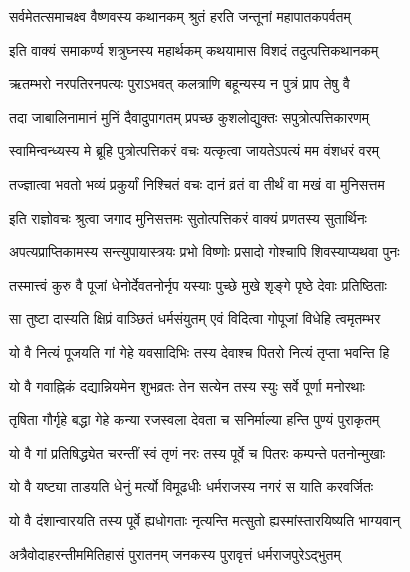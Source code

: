 \twolineshloka
{सर्वमेतत्समाचक्ष्व वैष्णवस्य कथानकम्}
{श्रुतं हरति जन्तूनां महापातकपर्वतम्}%


\twolineshloka
{इति वाक्यं समाकर्ण्य शत्रुघ्नस्य महार्थकम्}
{कथयामास विशदं तदुत्पत्तिकथानकम्}%

\twolineshloka
{ऋतम्भरो नरपतिरनपत्यः पुराऽभवत्}
{कलत्राणि बहून्यस्य न पुत्रं प्राप तेषु वै}%

\twolineshloka
{तदा जाबालिनामानं मुनिं दैवादुपागतम्}
{प्रपच्छ कुशलोद्युक्तः सपुत्रोत्पत्तिकारणम्}%


\twolineshloka
{स्वामिन्वन्ध्यस्य मे ब्रूहि पुत्रोत्पत्तिकरं वचः}
{यत्कृत्वा जायतेऽपत्यं मम वंशधरं वरम्}%

\twolineshloka
{तज्ज्ञात्वा भवतो भव्यं प्रकुर्यां निश्चितं वचः}
{दानं व्रतं वा तीर्थं वा मखं वा मुनिसत्तम}%

\twolineshloka
{इति राज्ञोवचः श्रुत्वा जगाद मुनिसत्तमः}
{सुतोत्पत्तिकरं वाक्यं प्रणतस्य सुतार्थिनः}%

\twolineshloka
{अपत्यप्राप्तिकामस्य सन्त्युपायास्त्रयः प्रभो}
{विष्णोः प्रसादो गोश्चापि शिवस्याप्यथवा पुनः}%

\twolineshloka
{तस्मात्त्वं कुरु वै पूजां धेनोर्देवतनोर्नृप}
{यस्याः पुच्छे मुखे शृङ्गे पृष्ठे देवाः प्रतिष्ठिताः}%

\twolineshloka
{सा तुष्टा दास्यति क्षिप्रं वाञ्छितं धर्मसंयुतम्}
{एवं विदित्वा गोपूजां विधेहि त्वमृतम्भर}%

\twolineshloka
{यो वै नित्यं पूजयति गां गेहे यवसादिभिः}
{तस्य देवाश्च पितरो नित्यं तृप्ता भवन्ति हि}%

\twolineshloka
{यो वै गवाह्निकं दद्यान्नियमेन शुभव्रतः}
{तेन सत्येन तस्य स्युः सर्वे पूर्णा मनोरथाः}%

\twolineshloka
{तृषिता गौर्गृहे बद्धा गेहे कन्या रजस्वला}
{देवता च सनिर्माल्या हन्ति पुण्यं पुराकृतम्}%

\twolineshloka
{यो वै गां प्रतिषिद्ध्येत चरन्तीं स्वं तृणं नरः}
{तस्य पूर्वे च पितरः कम्पन्ते पतनोन्मुखाः}%

\twolineshloka
{यो वै यष्ट्या ताडयति धेनुं मर्त्यो विमूढधीः}
{धर्मराजस्य नगरं स याति करवर्जितः}%

\twolineshloka
{यो वै दंशान्वारयति तस्य पूर्वे ह्यधोगताः}
{नृत्यन्ति मत्सुतो ह्यस्मांस्तारयिष्यति भाग्यवान्}%

\twolineshloka
{अत्रैवोदाहरन्तीममितिहासं पुरातनम्}
{जनकस्य पुरावृत्तं धर्मराजपुरेऽद्भुतम्}%

